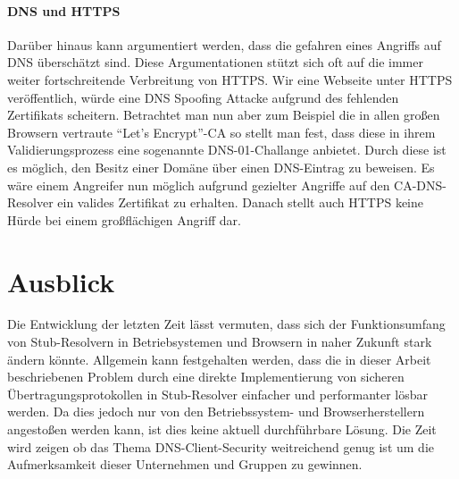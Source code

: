 \paragraph{DNS und HTTPS}
Darüber hinaus kann argumentiert werden, dass die gefahren eines Angriffs auf DNS überschätzt sind. Diese Argumentationen stützt sich oft auf die immer weiter fortschreitende Verbreitung von HTTPS. Wir eine Webseite unter HTTPS veröffentlich, würde eine DNS Spoofing Attacke aufgrund des fehlenden Zertifikats scheitern. Betrachtet man nun aber zum Beispiel die in allen großen Browsern vertraute ``Let's Encrypt''-CA so stellt man fest, dass diese in ihrem Validierungsprozess eine sogenannte DNS-01-Challange anbietet. Durch diese ist es möglich, den Besitz einer Domäne über einen DNS-Eintrag zu beweisen. Es wäre einem Angreifer nun möglich aufgrund gezielter Angriffe auf den CA-DNS-Resolver ein valides Zertifikat zu erhalten. Danach stellt auch HTTPS keine Hürde bei einem großflächigen Angriff dar.

\section{Ausblick}
Die Entwicklung der letzten Zeit lässt vermuten, dass sich der Funktionsumfang von Stub-Resolvern in Betriebsystemen\cite{Wallen2018} und Browsern\cite{McManus2018a} in naher Zukunft stark ändern könnte. Allgemein kann festgehalten werden, dass die in dieser Arbeit beschriebenen Problem durch eine direkte Implementierung von sicheren Übertragungsprotokollen in Stub-Resolver einfacher und performanter lösbar werden. Da dies jedoch nur von den Betriebssystem- und Browserherstellern angestoßen werden kann, ist dies keine aktuell durchführbare Lösung. Die Zeit wird zeigen ob das Thema DNS-Client-Security weitreichend genug ist um die Aufmerksamkeit dieser Unternehmen und Gruppen zu gewinnen.  

